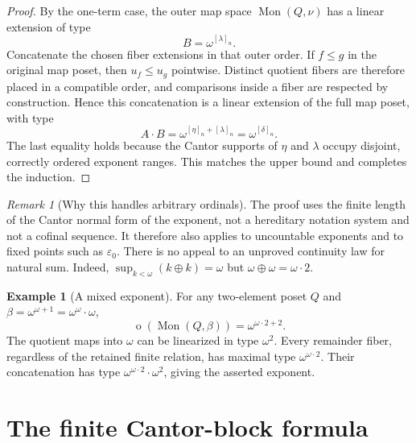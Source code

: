 \documentclass[11pt,a4paper]{article}
\theoremstyle{definition}
\newtheorem{example}[example]{Example}
\theoremstyle{remark}
\newtheorem{remark}[remark]{Remark}
\newcommand{\Mon}{\operatorname{Mon}}
\newcommand{\otype}{\operatorname{o}}
\newcommand{\Nrep}[2]{\left[#1\right]_{#2}}
\begin{document}
\begin{proof}
By the one-term case, the outer map space $\Mon(Q,\nu)$ has a linear
extension of type
\[
 B=\omega^{\Nrep{\lambda}{n}}.
\]
Concatenate the chosen fiber extensions in that outer order. If $f\leq g$
in the original map poset, then $u_f\leq u_g$ pointwise. Distinct quotient
fibers are therefore placed in a compatible order, and comparisons inside
a fiber are respected by construction. Hence this concatenation is a
linear extension of the full map poset, with type
\[
 A\cdot B
 =\omega^{\Nrep{\eta}{n}+\Nrep{\lambda}{n}}
 =\omega^{\Nrep{\delta}{n}}.
\]
The last equality holds because the Cantor supports of $\eta$ and
$\lambda$ occupy disjoint, correctly ordered exponent ranges. This matches
the upper bound and completes the induction.
\end{proof}

\begin{remark}[Why this handles arbitrary ordinals]
The proof uses the finite length of the Cantor normal form of the exponent,
not a hereditary notation system and not a cofinal sequence. It therefore
also applies to uncountable exponents and to fixed points such as
$\varepsilon_0$. There is no appeal to an unproved continuity law for
natural sum. Indeed,
$\sup_{k<\omega}(k\oplus k)=\omega$ but
$\omega\oplus\omega=\omega\cdot2$.
\end{remark}

\begin{example}[A mixed exponent]\label{ex:mixed}
For any two-element poset $Q$ and
$\beta=\omega^{\omega+1}=\omega^\omega\cdot\omega$,
\[
 \otype(\Mon(Q,\beta))=\omega^{\omega\cdot2+2}.
\]
The quotient maps into $\omega$ can be linearized in type $\omega^2$.
Every remainder fiber, regardless of the retained finite relation, has
maximal type $\omega^{\omega\cdot2}$. Their concatenation has type
$\omega^{\omega\cdot2}\cdot\omega^2$, giving the asserted exponent.
\end{example}

\section{The finite Cantor-block formula}
\end{document}
